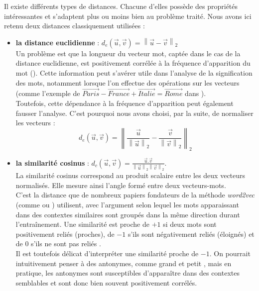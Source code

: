 \documentclass[11pt,french,french]{article}
\providecommand{\tightlist}{%
  \setlength{\parskip}{0pt}
  }
\begin{document}
Il existe différents types de distances. Chacune d'elles possède des
propriétés intéressantes et s'adaptent plus ou moins bien au problème
traité. Nous avons ici retenu deux distances classiquement utilisées :

\begin{itemize}
\tightlist
\item
  \textbf{la distance euclidienne} :
  \(d_{e}(\vec{u},\vec{v}) = \left\| \vec{u} - \vec{v} \right\|_2\)\\
  Un problème est que la longueur du vecteur mot, captée dans le cas de
  la distance euclidienne, est positivement corrélée à la fréquence
  d'apparition du mot (\cite{Schakel}). Cette information peut s'avérer
  utile dans l'analyse de la signification des mots, notamment lorsque
  l'on effectue des opérations sur les vecteurs (comme l'exemple de
  \(\overrightarrow{Paris} - \overrightarrow{France} + \overrightarrow{Italie} = \overrightarrow{Rome}\)
  dans \cite{Mikolov}).\\
  Toutefois, cette dépendance à la fréquence d'apparition peut également
  fausser l'analyse. C'est pourquoi nous avons choisi, par la suite, de
  normaliser les vecteurs :
  \[ d_{e}(\vec{u},\vec{v}) = \left\| \frac{\vec{u}}{\left\| \vec{u} \right\|_2} - \frac{\vec{v}}{\left\| \vec{v} \right\|_2}  \right\|_2\]
\item
  \textbf{la similarité cosinus} :
  \(d_{c}(\vec{u}, \vec{v}) = \frac{\vec{u}.\vec{v}}{\left\| \vec{u} \right\|_2 \left\| \vec{v} \right\|_2 }\).\\
  La similarité cosinus correspond au produit scalaire entre les deux
  vecteurs normalisés. Elle mesure ainsi l'angle formé entre deux
  vecteurs-mots.\\
  C'est la distance que de nombreux papiers fondateurs de la méthode
  \emph{word2vec} (comme \cite{Mikolov} ou \cite{Levy}) utilisent, avec
  l'argument selon lequel les mots apparaissant dans des contextes
  similaires sont groupés dans la même direction durant l'entraînement.
  Une similarité est proche de \(+1\) si deux mots sont positivement
  reliés (proches), de \(-1\) s'ils sont négativement reliés (éloignés)
  et de 0 s'ils ne sont pas \og reliés \fg{}.\\
  Il est toutefois délicat d'interpréter une similarité proche de
  \(-1\). On pourrait intuitivement penser à des antonymes, comme
  \og grand \fg{} et \og petit \fg{}, mais en pratique, les antonymes
  sont susceptibles d'apparaître dans des contextes semblables et sont
  donc bien souvent positivement corrélés.
\end{itemize}
\end{document}
